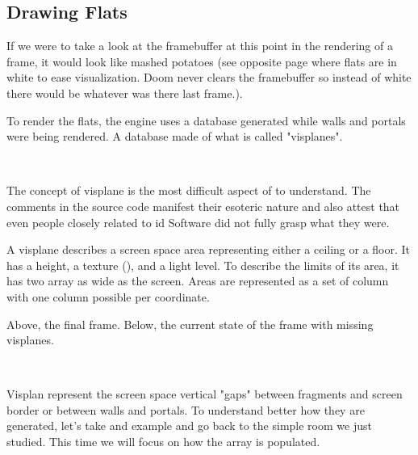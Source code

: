 \subsection{Drawing Flats}
 If we were to take a look at the framebuffer at this point in the rendering of a frame, it would look like mashed potatoes (see opposite page where flats are in white to ease visualization. Doom never clears the framebuffer so instead of white there would be whatever was there last frame.).\\
\par
To render the flats, the engine uses a database generated while walls and portals were being rendered. A database made of what is called "visplanes".\\
\par
{}\\
\par
The concept of visplane is the most difficult aspect of \doom{} to understand. The comments in the source code manifest their esoteric nature and also attest that even people closely related to id Software did not fully grasp what they were.\\
\par
A visplane describes a screen space area representing either a ceiling or a floor. It has a height, a texture (), and a light level. To describe the limits of its area, it has two array as wide as the screen. Areas are represented as a set of column with one column possible per  coordinate.
\par


 \label{mashed_potatoes1.png}

Above, the final frame. Below, the current state of the frame with missing visplanes.

\vspace{4mm}




\vspace{-4mm}
\\
\par
Visplan represent the screen space vertical "gaps" between fragments and screen border or between walls and portals. To understand better how they are generated, let's take and example and go back to the simple room we just studied. This time we will focus on how the  array is populated.\\
\par


